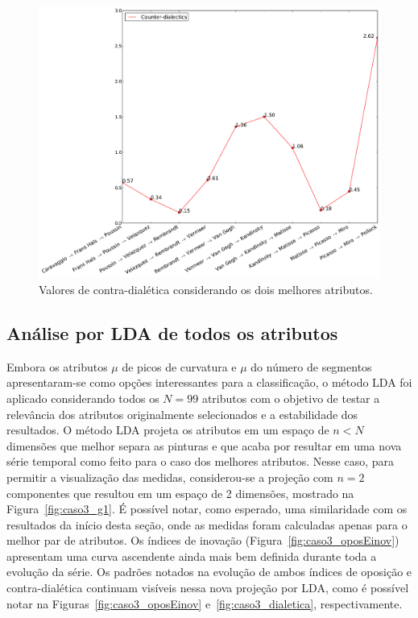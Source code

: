 \begin{figure}[h!]
\begin{center}
        \includegraphics[width=\columnwidth]{figs/caso1_dialetica}
    \caption{Valores de contra-dialética considerando os dois melhores atributos.}
        \label{fig:caso1_dialetica}
\end{center}
\end{figure}

\subsection{Análise por LDA de todos os atributos}
\label{subsec:lda}

Embora os atributos $\mu$ de picos de curvatura e $\mu$ do número de
segmentos apresentaram-se como opções interessantes para a
classificação, o método LDA foi aplicado considerando todos os $N =
99$ atributos com o objetivo de testar a relevância dos atributos
originalmente selecionados e a estabilidade dos resultados. O método
LDA projeta os atributos em um espaço de $n < N$ dimensões que melhor
separa as pinturas e que acaba por resultar em uma nova série temporal
como feito para o caso dos melhores atributos. Nesse caso, para
permitir a visualização das medidas, considerou-se a projeção com $n =
2$ componentes que resultou em um espaço de 2 dimensões, mostrado na
Figura~\ref{fig:caso3_g1}. É possível notar, como esperado, uma
similaridade com os resultados da início desta seção, onde as medidas
foram calculadas apenas para o melhor par de atributos. Os índices de
inovação (Figura~\ref{fig:caso3_oposEinov}) apresentam uma curva
ascendente ainda mais bem definida durante toda a evolução da
série. Os padrões notados na evolução de ambos índices de oposição e
contra-dialética continuam visíveis nessa nova projeção por LDA, como
é possível notar na Figuras~\ref{fig:caso3_oposEinov}
e~\ref{fig:caso3_dialetica}, respectivamente.

